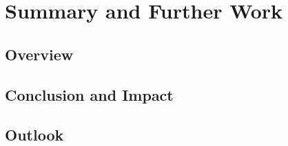 \chapter{Summary and Further Work}

\section{Overview}

\section{Conclusion and Impact}

\section{Outlook}
